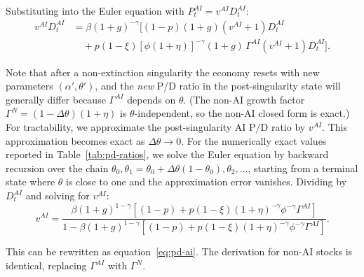 \documentclass[12pt]{article}
\begin{document}
Substituting into the Euler equation with $P_t^{AI} = v^{AI} D_t^{AI}$:
\begin{equation} \label{eq:euler-expand}
\begin{split}
v^{AI} D_t^{AI} &= \beta(1+g)^{-\gamma} \Big[ (1-p)(1+g)(v^{AI}+1) D_t^{AI} \\
&\quad + p(1-\xi) [\phi(1+\eta)]^{-\gamma} (1+g) \, \Gamma^{AI} (v^{AI}+1) D_t^{AI} \Big].
\end{split}
\end{equation}

Note that after a non-extinction singularity the economy resets with new parameters $(\alpha', \theta')$, and the \emph{new} P/D ratio in the post-singularity state will generally differ because $\Gamma^{AI}$ depends on $\theta$. (The non-AI growth factor $\Gamma^{N} = (1-\Delta\theta)(1+\eta)$ is $\theta$-independent, so the non-AI closed form is exact.) For tractability, we approximate the post-singularity AI P/D ratio by $v^{AI}$. This approximation becomes exact as $\Delta\theta \to 0$. For the numerically exact values reported in Table~\ref{tab:pd-ratios}, we solve the Euler equation by backward recursion over the chain $\theta_0, \theta_1 = \theta_0 + \Delta\theta(1-\theta_0), \theta_2, \ldots$, starting from a terminal state where $\theta$ is close to one and the approximation error vanishes. Dividing by $D_t^{AI}$ and solving for $v^{AI}$:
%
\begin{equation}
v^{AI} = \frac{\beta(1+g)^{1-\gamma}\left[(1-p) + p(1-\xi)(1+\eta)^{-\gamma}\phi^{-\gamma} \Gamma^{AI}\right]}{1 - \beta(1+g)^{1-\gamma}\left[(1-p) + p(1-\xi)(1+\eta)^{-\gamma}\phi^{-\gamma} \Gamma^{AI}\right]}. \label{eq:pd-ai-solve}
\end{equation}

This can be rewritten as equation~\eqref{eq:pd-ai}. The derivation for non-AI stocks is identical, replacing $\Gamma^{AI}$ with $\Gamma^{N}$.

\printbibliography
\end{document}
